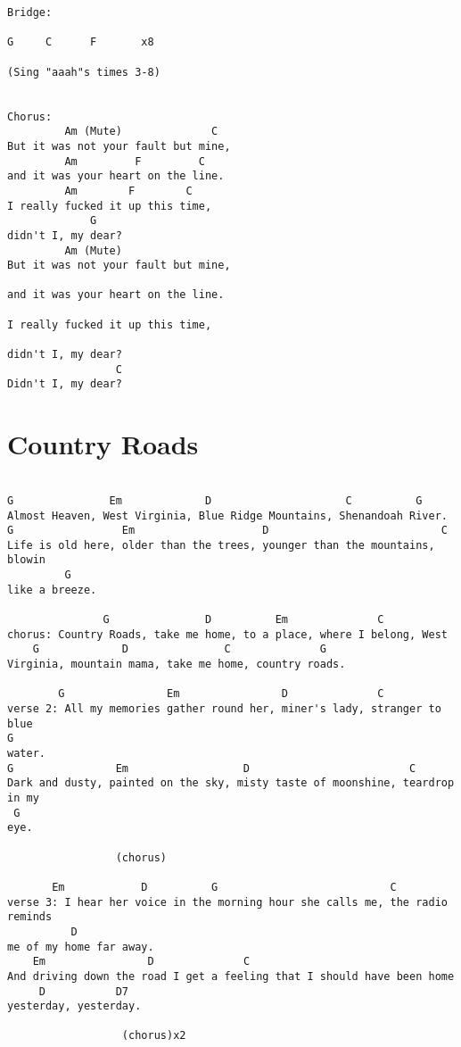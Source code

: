 \documentclass[leqno]{memoir}
\begin{document}
\begin{verbatim}
Bridge:

G     C      F       x8

(Sing "aaah"s times 3-8)


Chorus:
         Am (Mute)              C
But it was not your fault but mine,
         Am         F         C
and it was your heart on the line.
         Am        F        C
I really fucked it up this time,
             G
didn't I, my dear?
         Am (Mute)
But it was not your fault but mine,

and it was your heart on the line.

I really fucked it up this time,

didn't I, my dear?
                 C
Didn't I, my dear?
\end{verbatim}
\newpage

\chapter{Country Roads}
\begin{verbatim}

G               Em             D                     C          G
Almost Heaven, West Virginia, Blue Ridge Mountains, Shenandoah River.
G                 Em                    D                           C
Life is old here, older than the trees, younger than the mountains, blowin 
         G
like a breeze.

               G               D          Em              C
chorus: Country Roads, take me home, to a place, where I belong, West 
    G             D               C              G
Virginia, mountain mama, take me home, country roads.

        G                Em                D              C
verse 2: All my memories gather round her, miner's lady, stranger to blue 
G
water.
G                Em                  D                         C
Dark and dusty, painted on the sky, misty taste of moonshine, teardrop in my 
 G
eye.

                 (chorus)

       Em            D          G                           C
verse 3: I hear her voice in the morning hour she calls me, the radio reminds
          D        
me of my home far away.
    Em                D              C
And driving down the road I get a feeling that I should have been home 
     D           D7
yesterday, yesterday.

                  (chorus)x2
\end{verbatim}
\newpage
\end{document}
